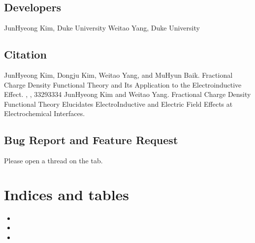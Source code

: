 \documentclass[letterpaper,10pt,english]{sphinxmanual}
\begin{document}
\section{Developers}
\label{\detokenize{about:developers}}
\sphinxAtStartPar
Jun\sphinxhyphen{}Hyeong Kim, Duke University
Weitao Yang, Duke University


\section{Citation}
\label{\detokenize{about:citation}}
\sphinxAtStartPar
Jun\sphinxhyphen{}Hyeong Kim, Dongju Kim, Weitao Yang, and Mu\sphinxhyphen{}Hyun Baik. Fractional Charge Density Functional Theory and Its Application to the Electro\sphinxhyphen{}inductive Effect.  , , 3329\sphinxhyphen{}3334
Jun\sphinxhyphen{}Hyeong Kim and Weitao Yang. Fractional Charge Density Functional Theory Elucidates Electro\sphinxhyphen{}Inductive and Electric Field Effects at Electrochemical Interfaces. 


\section{Bug Report and Feature Request}
\label{\detokenize{about:bug-report-and-feature-request}}
\sphinxAtStartPar
Please open a thread on the  tab.


\chapter{Indices and tables}
\label{\detokenize{index:indices-and-tables}}\begin{itemize}
\item {} 
\sphinxAtStartPar
{}

\item {} 
\sphinxAtStartPar
{}

\item {} 
\sphinxAtStartPar
{}

\end{itemize}



\renewcommand{\indexname}{Index}
\printindex
\end{document}
